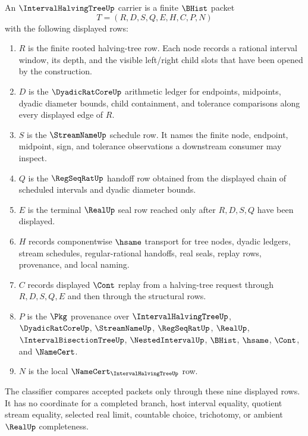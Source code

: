 \begin{definition}
\label{def:interval-halving-tree-carrier}
An $\IntervalHalvingTreeUp$ carrier is a finite $\BHist$ packet
$$
T=(R,D,S,Q,E,H,C,P,N)
$$
with the following displayed rows:
\begin{enumerate}
\item $R$ is the finite rooted halving-tree row. Each node records a rational interval window, its depth, and the visible left/right child slots that have been opened by the construction.
\item $D$ is the $\DyadicRatCoreUp$ arithmetic ledger for endpoints, midpoints, dyadic diameter bounds, child containment, and tolerance comparisons along every displayed edge of $R$.
\item $S$ is the $\StreamNameUp$ schedule row. It names the finite node, endpoint, midpoint, sign, and tolerance observations a downstream consumer may inspect.
\item $Q$ is the $\RegSeqRatUp$ handoff row obtained from the displayed chain of scheduled intervals and dyadic diameter bounds.
\item $E$ is the terminal $\RealUp$ seal row reached only after $R,D,S,Q$ have been displayed.
\item $H$ records componentwise $\hsame$ transport for tree nodes, dyadic ledgers, stream schedules, regular-rational handoffs, real seals, replay rows, provenance, and local naming.
\item $C$ records displayed $\Cont$ replay from a halving-tree request through $R,D,S,Q,E$ and then through the structural rows.
\item $P$ is the $\Pkg$ provenance over $\IntervalHalvingTreeUp$, $\DyadicRatCoreUp$, $\StreamNameUp$, $\RegSeqRatUp$, $\RealUp$, $\IntervalBisectionTreeUp$, $\NestedIntervalUp$, $\BHist$, $\hsame$, $\Cont$, and $\NameCert$.
\item $N$ is the local $\NameCert_{\IntervalHalvingTreeUp}$ row.
\end{enumerate}
The classifier compares accepted packets only through these nine displayed rows. It has no coordinate for a completed branch, host interval equality, quotient stream equality, selected real limit, countable choice, trichotomy, or ambient $\RealUp$ completeness.
\end{definition}


